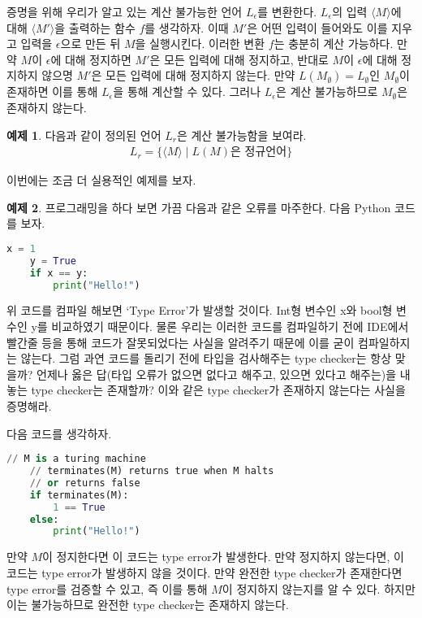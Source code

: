 \documentclass[b5paper]{book}
\theoremstyle{definition}
\newtheorem{ex}{예제}[chapter]
\newenvironment{pf*}{\pushQED{\qed}\pf}{\popQED\endpf}
\begin{document}
\begin{pf*}
    증명을 위해 우리가 알고 있는 계산 불가능한 언어 $L_\epsilon$를 변환한다. 
    $L_\epsilon$의 입력 $\langle M \rangle$에 대해 $\langle M' \rangle$을 
    출력하는 함수 $f$를 생각하자. 이때 $M'$은 어떤 입력이 들어와도 이를 지우고
    입력을 $\epsilon$으로 만든 뒤 $M$을 실행시킨다. 이러한 변환 $f$는 충분히
    계산 가능하다. 만약 $M$이 $\epsilon$에 대해 정지하면 $M'$은 모든 입력에 대해
    정지하고, 반대로 $M$이 $\epsilon$에 대해 정지하지 않으명 $M'$은 모든 입력에
    대해 정지하지 않는다. 만약 $L(M_\emptyset) = L_\emptyset$인 $M_\emptyset$이
    존재하면 이를 통해 $L_\epsilon$을 통해 계산할 수 있다. 그러나 $L_\epsilon$은
    계산 불가능하므로 $M_\emptyset$은 존재하지 않는다.
\end{pf*}
\begin{ex}
    다음과 같이 정의된 언어 $L_r$은 계산 불가능함을 보여라.
    \begin{align*}
        L_r = \{ \langle M \rangle \;\vert\; L(M) \text{은 정규언어} \}
    \end{align*}
\end{ex}
이번에는 조금 더 실용적인 예제를 보자. 
\begin{ex}
    프로그래밍을 하다 보면 가끔 다음과 같은 오류를 마주한다. 다음 Python 코드를 보자.
\begin{lstlisting}[language=Python]
    x = 1 
    y = True
    if x == y:
        print("Hello!")
\end{lstlisting}
    위 코드를 컴파일 해보면 `Type Error'가 발생할 것이다. Int형 변수인 x와 bool형 변수인 y를 
    비교하였기 때문이다. 물론 우리는 이러한 코드를 컴파일하기 전에 IDE에서 빨간줄 등을 통해 코드가 
    잘못되었다는 사실을 알려주기 때문에 이를 굳이 컴파일하지는 않는다. 그럼 과연 코드를 돌리기 전에
    타입을 검사해주는 type checker는 항상 맞을까? 언제나 옳은 답(타입 오류가 없으면 없다고 해주고, 
    있으면 있다고 해주는)을 내놓는 type checker는 존재할까? 이와 같은 type checker가 존재하지 않는다는
    사실을 증명해라. 
\end{ex}
\begin{pf*}
    다음 코드를 생각하자. 
\begin{lstlisting}[language=Python]
    // M is a turing machine
    // terminates(M) returns true when M halts
    // or returns false 
    if terminates(M):
        1 == True 
    else:
        print("Hello!")
\end{lstlisting}
만약 $M$이 정지한다면 이 코드는 type error가 발생한다. 만약 정지하지 않는다면, 이 코드는 type error가
발생하지 않을 것이다. 만약 완전한 type checker가 존재한다면 type error를 검증할 수 있고, 즉 이를 통해 
$M$이 정지하지 않는지를 알 수 있다. 하지만 이는 불가능하므로 완전한 type checker는 존재하지 않는다. 
\end{pf*}
\end{document}
